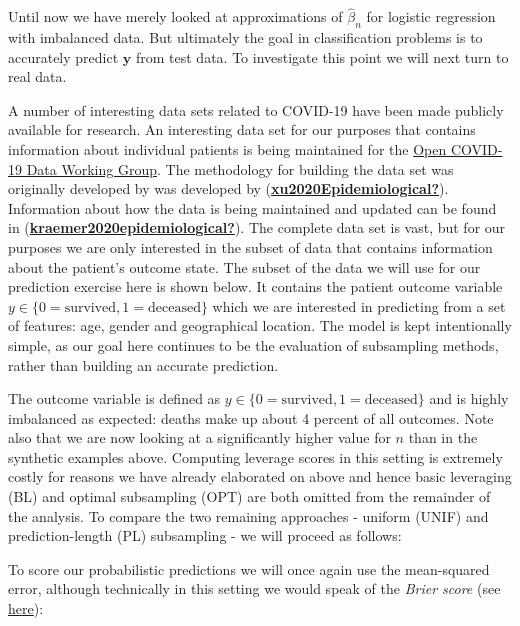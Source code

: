 \documentclass[
]{book}
\begin{document}
Until now we have merely looked at approximations of \(\hat\beta_n\) for logistic regression with imbalanced data. But ultimately the goal in classification problems is to accurately predict \(\mathbf{y}\) from test data. To investigate this point we will next turn to real data.

A number of interesting data sets related to COVID-19 have been made publicly available for research. An interesting data set for our purposes that contains information about individual patients is being maintained for the \href{https://github.com/beoutbreakprepared/nCoV2019}{Open COVID-19 Data Working Group}. The methodology for building the data set was originally developed by was developed by (\protect\hyperlink{ref-xu2020Epidemiological}{\textbf{xu2020Epidemiological?}}). Information about how the data is being maintained and updated can be found in (\protect\hyperlink{ref-kraemer2020epidemiological}{\textbf{kraemer2020epidemiological?}}).
The complete data set is vast, but for our purposes we are only interested in the subset of data that contains information about the patient's outcome state. The subset of the data we will use for our prediction exercise here is shown below. It contains the patient outcome variable \(y\in \{0=\text{survived}, 1=\text{deceased}\}\) which we are interested in predicting from a set of features: age, gender and geographical location. The model is kept intentionally simple, as our goal here continues to be the evaluation of subsampling methods, rather than building an accurate prediction.

\hypertarget{htmlwidget-1b87aa3c9c5871345311}{}

The outcome variable is defined as \(y\in\{0=\text{survived},1=\text{deceased}\}\) and is highly imbalanced as expected: deaths make up about 4 percent of all outcomes. Note also that we are now looking at a significantly higher value for \(n\) than in the synthetic examples above. Computing leverage scores in this setting is extremely costly for reasons we have already elaborated on above and hence basic leveraging (BL) and optimal subsampling (OPT) are both omitted from the remainder of the analysis. To compare the two remaining approaches - uniform (UNIF) and prediction-length (PL) subsampling - we will proceed as follows:

To score our probabilistic predictions we will once again use the mean-squared error, although technically in this setting we would speak of the \emph{Brier score} (see \href{https://en.wikipedia.org/wiki/Brier_score}{here}):
\end{document}
